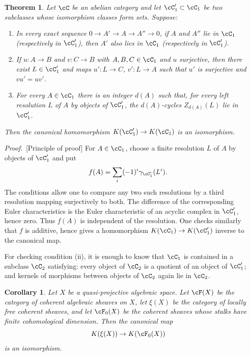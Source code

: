\documentclass[11pt]{article}
\theoremstyle{plain}
\newtheorem*{theorem*}{Theorem}
\newtheorem*{corollary*}{Corollary}
\theoremstyle{definition}
\theoremstyle{remark}
\newenvironment{prooftext}{\par\noindent\textit{Proof.}\ }{\par\medskip}
\begin{document}
\begin{theorem*}\label{thm:Kiso}
Let $\cC$ be an abelian category and let $\cC'_1\subset\cC_1$ be two subclasses whose isomorphism classes form sets. Suppose:
\begin{enumerate}[label=(\roman*)]
\item In every exact sequence $0\to A'\to A\to A''\to0$, if $A$ and $A''$ lie in $\cC_1$ (respectively in $\cC'_1$), then $A'$ also lies in $\cC_1$ (respectively in $\cC'_1$).
\item If $u:A\to B$ and $v:C\to B$ with $A,B,C\in\cC_1$ and $u$ surjective, then there exist $L\in\cC'_1$ and maps $u':L\to C$, $v':L\to A$ such that $u'$ is surjective and $vu'=uv'$.
\item For every $A\in\cC_1$ there is an integer $d(A)$ such that, for every left resolution $L$ of $A$ by objects of $\cC'_1$, the $d(A)$-cycles $Z_{d(A)}(L)$ lie in $\cC'_1$.
\end{enumerate}
Then the canonical homomorphism $K(\cC'_1)\to K(\cC_1)$ is an isomorphism.
\end{theorem*}

\begin{prooftext}[Principle of proof]
For $A\in\cC_1$, choose a finite resolution $L$ of $A$ by objects of $\cC'_1$ and put
\[
   f(A)=\sum_i(-1)^i\gamma_{\cC'_1}(L^i).
\]
The conditions allow one to compare any two such resolutions by a third resolution mapping surjectively to both. The difference of the corresponding Euler characteristics is the Euler characteristic of an acyclic complex in $\cC'_1$, hence zero. Thus $f(A)$ is independent of the resolution. One checks similarly that $f$ is additive, hence gives a homomorphism $K(\cC_1)\to K(\cC'_1)$ inverse to the canonical map.
\end{prooftext}

For checking condition (ii), it is enough to know that $\cC_1$ is contained in a subclass $\cC_2$ satisfying: every object of $\cC_2$ is a quotient of an object of $\cC'_1$; and kernels of morphisms between objects of $\cC_2$ again lie in $\cC_2$.

\begin{corollary*}
Let $X$ be a quasi-projective algebraic space. Let $\cF(X)$ be the category of coherent algebraic sheaves on $X$, let $\xi(X)$ be the category of locally free coherent sheaves, and let $\cF_0(X)$ be the coherent sheaves whose stalks have finite cohomological dimension. Then the canonical map
\begin{equation}\label{eq:vectorbundlestoF0}
   K(\xi(X))\to K(\cF_0(X))
\end{equation}
is an isomorphism.
\end{corollary*}
\end{document}
